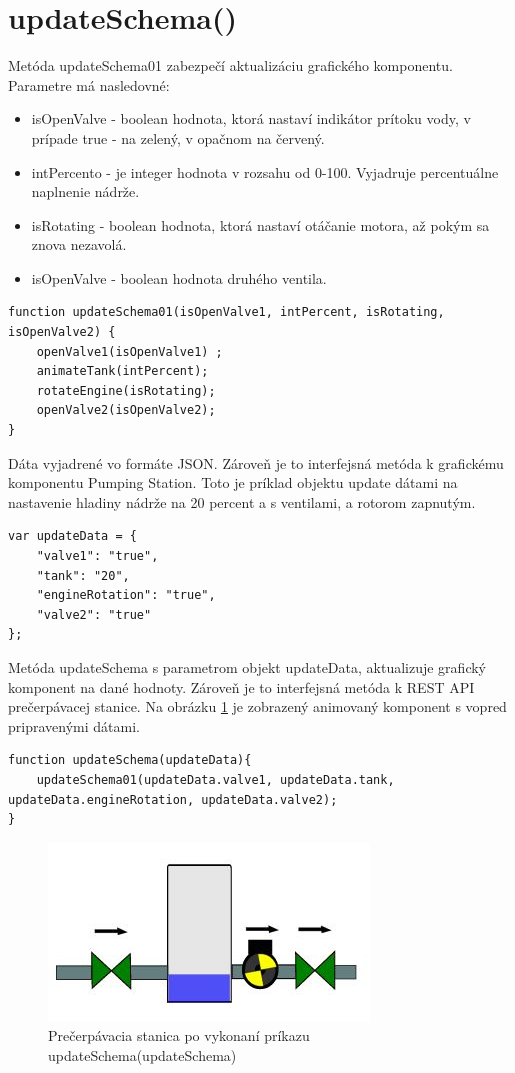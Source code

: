 \section{updateSchema()}

Metóda updateSchema01 zabezpečí aktualizáciu grafického komponentu. Parametre má nasledovné: 
\begin{itemize}
\item isOpenValve - boolean hodnota, ktorá nastaví indikátor prítoku vody, v prípade true - na zelený, v opačnom na červený. 
\item intPercento - je integer hodnota v rozsahu od 0-100. Vyjadruje percentuálne naplnenie nádrže. 
\item isRotating - boolean hodnota, ktorá nastaví otáčanie motora, až pokým sa znova nezavolá. 
\item isOpenValve - boolean hodnota druhého ventila. 
	
\end{itemize}

\begin{lstlisting}
function updateSchema01(isOpenValve1, intPercent, isRotating, isOpenValve2) {
	openValve1(isOpenValve1) ;
	animateTank(intPercent);
	rotateEngine(isRotating);
	openValve2(isOpenValve2);
}
\end{lstlisting}

Dáta vyjadrené vo formáte \ac*{JSON}. Zároveň je to interfejsná metóda k grafickému komponentu Pumping Station. Toto je príklad objektu update dátami na nastavenie hladiny nádrže na 20 percent a s ventilami, a rotorom zapnutým.  
\begin{lstlisting}
var updateData = {
	"valve1": "true",
	"tank": "20",
	"engineRotation": "true",
	"valve2": "true"
};
\end{lstlisting}
Metóda updateSchema s parametrom objekt updateData, aktualizuje grafický komponent na dané hodnoty. Zároveň je  to interfejsná metóda k REST API prečerpávacej stanice. Na obrázku \ref{fig:updateSchema} je zobrazený animovaný komponent s vopred pripravenými dátami. 
\begin{lstlisting}
function updateSchema(updateData){
	updateSchema01(updateData.valve1, updateData.tank, updateData.engineRotation, updateData.valve2);
}
\end{lstlisting}


\begin{figure}[H]
\centering
\includegraphics[width=0.7\linewidth]{obrazky/updateSchema}
\caption{Prečerpávacia stanica po vykonaní príkazu updateSchema(updateSchema)}
\label{fig:updateSchema}
\end{figure}



